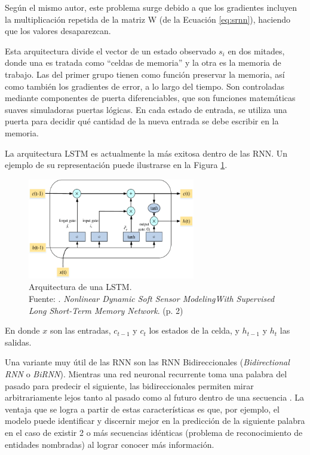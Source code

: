 \begin{itemize}
\begin{itemize}
		Según el mismo autor, este problema surge debido a que los gradientes incluyen la multiplicación repetida de la matriz W (de la Ecuación \ref{eq:srnn}), haciendo que los valores desaparezcan.
		
		Esta arquitectura divide el vector de un estado observado $s_i$ en dos mitades, donde una es tratada como “celdas de memoria” y la otra es la memoria de trabajo. Las del primer grupo tienen como función preservar la memoria, así como también los gradientes de error, a lo largo del tiempo. Son controladas mediante componentes de puerta diferenciables, que son funciones matemáticas suaves simuladoras puertas lógicas. En cada estado de entrada, se utiliza una puerta para decidir qué cantidad de la nueva entrada se debe escribir en la memoria.
		
		La arquitectura LSTM es actualmente la más exitosa dentro de las RNN. Un ejemplo de su representación puede ilustrarse en la Figura \ref{2:fig43}.
		
		\begin{figure}[!ht]
			\begin{center}
				\includegraphics[width=0.65\textwidth]{2/figures/lstm.png}
				\caption[Arquitectura de una LSTM]{Arquitectura de una LSTM.\\
				Fuente: \cite{tec_yuan2019lstm}. \textit{Nonlinear Dynamic Soft Sensor ModelingWith Supervised	Long Short-Term Memory Network}. (p. 2)}
				\label{2:fig43}
			\end{center}
		\end{figure}
	
		En donde $x$ son las entradas, $c_{t-1}$ y $c_{t}$ los estados de la celda, y $h_{t-1}$ y $h_{t}$  las salidas.
		
		Una variante muy útil de las RNN son las RNN Bidireccionales (\textit{Bidirectional RNN} o \textit{BiRNN}). Mientras una red neuronal recurrente toma una palabra del pasado para predecir el siguiente, las bidireccionales permiten mirar arbitrariamente lejos tanto al pasado como al futuro dentro de una secuencia \parencite{bk_goldberg2017nn_nlp}.
		La ventaja que se logra a partir de estas características es que, por ejemplo, el modelo puede identificar y discernir mejor en la predicción de la siguiente palabra en el caso de existir 2 o más secuencias idénticas (problema de reconocimiento de entidades nombradas) al lograr conocer más información.
		

\end{itemize}
\end{itemize}
